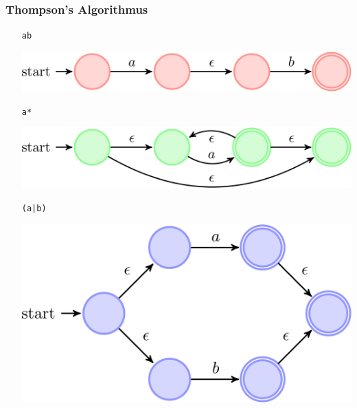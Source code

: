 \documentclass[ignorenonframetext]{beamer}
\begin{document}
\begin{frame}[plain]
    \frametitle{Thompson's Algorithmus}
	
	\begin{itemize}
		\item[{\color{red}\texttt{ab}}]
\begin{centering}\includegraphics[scale=0.22]{ab.pdf}\end{centering}
		\item[]
		\item[{\color{green}\texttt{a*}}]
\begin{centering}\includegraphics[scale=0.22]{astar.pdf}\end{centering}
		\item[]
		\item[{\color{blue}\texttt{(a|b)}}]
\begin{centering}\includegraphics[scale=0.22]{aorb.pdf}\end{centering}
	\end{itemize}
\end{frame}
\end{document}
